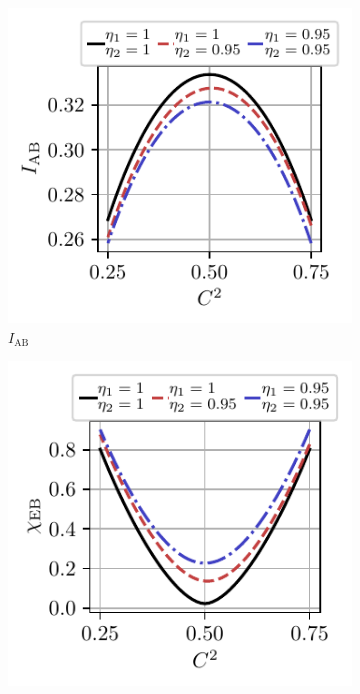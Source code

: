 \documentclass[%
reprint,
superscriptaddress,
 amsmath,amssymb,amsfonts,
 aps,
 pra,
 longbibliography
]{revtex4-2}
\newcommand{\ind}[1]{\mathrm{#1}}
\begin{document}
\begin{figure}
    \centering
    \begin{subfigure}[c]{.3\linewidth}
\includegraphics[width=\linewidth, trim={.2cm .3cm .4cm .35cm},clip]{pics/qkd/hom/IAB.pdf}
\caption[]{$I_{\ind{AB}}$}
        \end{subfigure}
\hfill
        \begin{subfigure}[c]{.3\linewidth}
 \includegraphics[width=\linewidth, trim={.2cm .3cm .4cm .35cm},clip]{pics/qkd/hom/chi.pdf}

\end{subfigure}
\end{figure}
\end{document}
